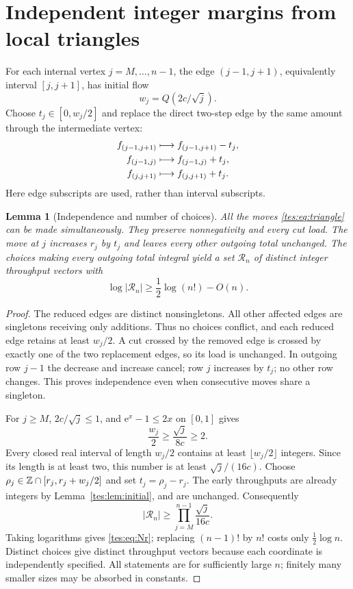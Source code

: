 \documentclass[11pt,a4paper]{article}
\newtheorem{lemma}[theorem]{Lemma}
\theoremstyle{remark}\newtheorem{remark}[theorem]{Remark}
\newcommand{\ee}{\mathrm e}\newcommand{\dd}{\,\mathrm d}
\numberwithin{equation}{section}
\begin{document}
\section{Independent integer margins from local triangles}\label{tes:sec:triangles}
For each internal vertex $j=M,\ldots,n-1$, the edge $(j-1,j+1)$, equivalently interval $[j,j+1]$, has initial flow
\begin{equation}\label{tes:eq:wj}
w_j=Q(2c/\sqrt j).
\end{equation}
Choose $t_j\in[0,w_j/2]$ and replace the direct two-step edge by the same amount through the intermediate vertex:
\begin{align}
f_{(j-1,j+1)}&\longmapsto f_{(j-1,j+1)}-t_j,\notag\\
f_{(j-1,j)}&\longmapsto f_{(j-1,j)}+t_j,\label{tes:eq:triangle}\\
f_{(j,j+1)}&\longmapsto f_{(j,j+1)}+t_j.\notag
\end{align}
Here edge subscripts are used, rather than interval subscripts.

\begin{lemma}[Independence and number of choices]\label{tes:lem:triangles}
All the moves \eqref{tes:eq:triangle} can be made simultaneously. They preserve nonnegativity and every cut load. The move at $j$ increases $r_j$ by $t_j$ and leaves every other outgoing total unchanged. The choices making every outgoing total integral yield a set $\mathcal R_n$ of distinct integer throughput vectors with
\begin{equation}\label{tes:eq:Nr}
\log|\mathcal R_n|\ge\frac12\log(n!)-O(n).
\end{equation}
\end{lemma}
\begin{proof}
The reduced edges are distinct nonsingletons. All other affected edges are singletons receiving only additions. Thus no choices conflict, and each reduced edge retains at least $w_j/2$. A cut crossed by the removed edge is crossed by exactly one of the two replacement edges, so its load is unchanged. In outgoing row $j-1$ the decrease and increase cancel; row $j$ increases by $t_j$; no other row changes. This proves independence even when consecutive moves share a singleton.

For $j\ge M$, $2c/\sqrt j\le1$, and $\ee^x-1\le2x$ on $[0,1]$ gives
\[
\frac{w_j}{2}\ge\frac{\sqrt j}{8c}\ge2.
\]
Every closed real interval of length $w_j/2$ contains at least $\lfloor w_j/2\rfloor$ integers. Since its length is at least two, this number is at least $\sqrt j/(16c)$. Choose $\rho_j\in\mathbb Z\cap[r_j,r_j+w_j/2]$ and set $t_j=\rho_j-r_j$. The early throughputs are already integers by Lemma~\ref{tes:lem:initial}, and are unchanged. Consequently
\[
|\mathcal R_n|\ge\prod_{j=M}^{n-1}\frac{\sqrt j}{16c}.
\]
Taking logarithms gives \eqref{tes:eq:Nr}; replacing $(n-1)!$ by $n!$ costs only $\tfrac12\log n$. Distinct choices give distinct throughput vectors because each coordinate is independently specified. All statements are for sufficiently large $n$; finitely many smaller sizes may be absorbed in constants.
\end{proof}
\end{document}
